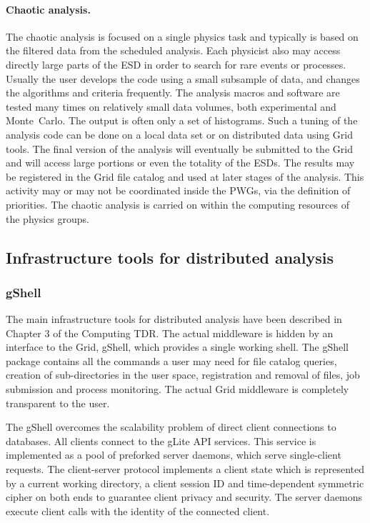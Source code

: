 \documentclass[12pt,a4paper,twoside]{article}
\makeatletter
\newcommand {\grid} {Grid\@\xspace}
\newcommand {\MC} {Monte~Carlo\@\xspace}
\makeatother
\begin{document}
{\noindent
\paragraph{Chaotic analysis.}
\noindent
The chaotic analysis is focused on a single physics task and
typically is based on the filtered data from the scheduled
analysis. Each physicist also
may access directly large parts of the ESD in order to search for rare
events or processes.
Usually the user develops the code using a small subsample
of data, and changes the algorithms and criteria frequently. The
analysis macros and software are tested many times on relatively
small data volumes, both experimental and \MC.
The output is often only a set of histograms. 
Such a tuning of the analysis code can be done on a local
data set or on distributed data using \grid tools. The final version
of the analysis 
will eventually be submitted to the \grid and will access large
portions or even 
the totality of the ESDs. The results may be registered in the \grid file
catalog and used at later stages of the analysis. 
This activity may or may not be coordinated inside
the PWGs, via the definition of priorities. The
chaotic analysis is carried on within the computing resources of the
physics groups.



\subsection{Infrastructure tools for distributed analysis}

\subsubsection{gShell}

The main infrastructure tools for distributed analysis have been
described in Chapter 3 of the Computing TDR\cite{CompTDR}. The actual
middleware is hidden by an interface to the \grid,
gShell\cite{CH6Ref:gShell}, which provides a 
single working shell.  
The gShell package contains all the commands a user may need for file
catalog queries, creation of sub-directories in the user space,
registration and removal of files, job submission and process
monitoring. The actual \grid middleware  is completely transparent to
the user.

The gShell overcomes the scalability problem of direct client
connections to databases. All clients connect to the
gLite\cite{CH6Ref:gLite} API 
services. This service is implemented as a pool of preforked server
daemons, which serve single-client requests. The client-server
protocol implements a client state which is represented by a current
working directory, a client session ID and time-dependent symmetric
cipher on both ends to guarantee client privacy and security. The
server daemons execute client calls with the identity of the connected
client. 

}
\end{document}
